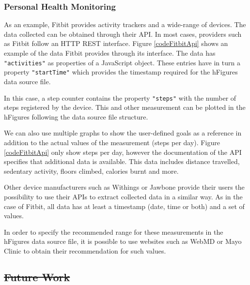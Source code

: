 \documentclass[twocolumn]{bmcart}%
\providecommand{\DIFadd}[1]{{\protect\color{blue}\uwave{#1}}} %
\providecommand{\DIFdel}[1]{{\protect\color{red}\sout{#1}}}                      %
\providecommand{\DIFaddbegin}{} %
\providecommand{\DIFaddend}{} %
\providecommand{\DIFdelbegin}{} %
\providecommand{\DIFdelend}{} %
\begin{document}
\subsubsection*{Personal Health Monitoring}

As an example, Fitbit provides activity trackers and a wide-range of devices. The data collected can be obtained through their API. In most cases, providers such as Fitbit follow an HTTP REST interface. Figure \ref{codeFitbitApi} shows an example of the data Fitbit provides through its interface. The data has \texttt{"activities"} as properties of a JavaScript object. These entries have in turn a property \texttt{"startTime"} which provides the timestamp required for the hFigures data source file.

In this case, a step counter contains the property \texttt{"steps"} with the number of steps registered by the device. This and other measurement can be plotted in the hFigures following the data source file structure.

We can also use multiple graphs to show the user-defined goals as a reference in addition to the actual values of the measurement (steps per day). Figure \ref{codeFitbitApi} only show steps per day, however the documentation of the API specifies that additional data is available. This data includes distance travelled, sedentary activity, floors climbed, calories burnt and more.

Other device manufacturers such as Withings or Jawbone provide their users the possibility to use their APIs to extract collected data in a similar way. As in the case of Fitbit, all data has at least a timestamp (date, time or both) and a set of values.

In order to specify the recommended range for these measurements in the hFigures data source file, it is possible to use websites such as WebMD or Mayo Clinic to obtain their recommendation for such values.

\subsection*{\DIFdelbegin \DIFdel{Future Work}\DIFdelend \DIFaddbegin \DIFadd{Limitations}\DIFaddend }
\end{document}

